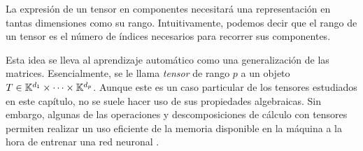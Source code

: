 La expresión de un tensor en componentes necesitará una representación en tantas dimensiones como su rango. Intuitivamente, podemos decir que el rango de un tensor es el número de índices necesarios para recorrer sus componentes.

Esta idea se lleva al aprendizaje automático como una generalización de las matrices. Esencialmente, se le llama \emph{tensor} de rango $p$ a un objeto $T\in \mathbb{K}^{d_1}\times \dots\times \mathbb{K}^{d_p}$. Aunque este es un caso particular de los tensores estudiados en este capítulo, no se suele hacer uso de sus propiedades algebraicas. Sin embargo, algunas de las operaciones y descomposiciones de cálculo con tensores permiten realizar un uso eficiente de la memoria disponible en la máquina a la hora de entrenar una red neuronal \autocite{kolda2009}.
